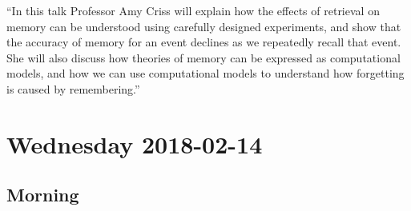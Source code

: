 \documentclass[]{article}
\begin{document}
``In this talk Professor Amy Criss will explain how the effects of
retrieval on memory can be understood using carefully designed
experiments, and show that the accuracy of memory for an event declines
as we repeatedly recall that event. She will also discuss how theories
of memory can be expressed as computational models, and how we can use
computational models to understand how forgetting is caused by
remembering.''

\pagebreak  

\section{Wednesday 2018-02-14}\label{wednesday-2018-02-14}

\subsection{Morning}\label{morning}
\end{document}
